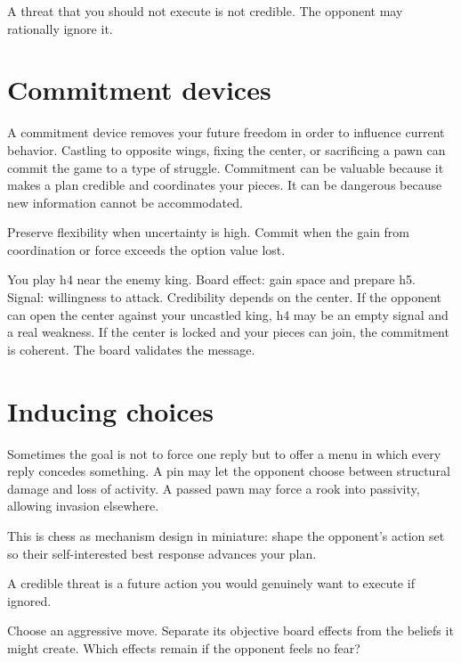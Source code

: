 A threat that you should not execute is not credible. The opponent may rationally ignore it.

\section{Commitment devices}
A commitment device removes your future freedom in order to influence current behavior. Castling to opposite wings, fixing the center, or sacrificing a pawn can commit the game to a type of struggle. Commitment can be valuable because it makes a plan credible and coordinates your pieces. It can be dangerous because new information cannot be accommodated.

Preserve flexibility when uncertainty is high. Commit when the gain from coordination or force exceeds the option value lost.

\begin{workedbox}[title={Worked example: the pawn storm signal}]
You play h4 near the enemy king. Board effect: gain space and prepare h5. Signal: willingness to attack. Credibility depends on the center. If the opponent can open the center against your uncastled king, h4 may be an empty signal and a real weakness. If the center is locked and your pieces can join, the commitment is coherent. The board validates the message.
\end{workedbox}

\section{Inducing choices}
Sometimes the goal is not to force one reply but to offer a menu in which every reply concedes something. A pin may let the opponent choose between structural damage and loss of activity. A passed pawn may force a rook into passivity, allowing invasion elsewhere.

This is chess as mechanism design in miniature: shape the opponent's action set so their self-interested best response advances your plan.

\begin{memorybox}
A credible threat is a future action you would genuinely want to execute if ignored.
\end{memorybox}

\begin{exercise}
Choose an aggressive move. Separate its objective board effects from the beliefs it might create. Which effects remain if the opponent feels no fear?
\end{exercise}

